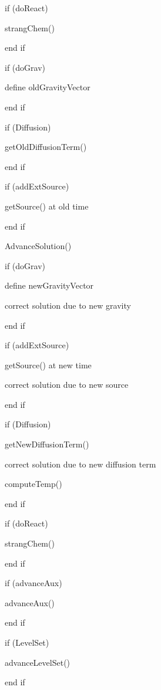 
\noindent

if (doReact)

\hspace{.1in}  strangChem()

end if

if (doGrav)

\hspace{.1in}  define oldGravityVector

end if

if (Diffusion)

\hspace{.1in}  getOldDiffusionTerm()

end if

if (addExtSource)

\hspace{.1in}  getSource() at old time

end if

AdvanceSolution()

if (doGrav)

\hspace{.1in}  define newGravityVector

\hspace{.1in}  correct solution due to new gravity

end if

if (addExtSource)

\hspace{.1in}  getSource() at new time

\hspace{.1in}  correct solution due to new source

end if

if (Diffusion)

\hspace{.1in}  getNewDiffusionTerm()

\hspace{.1in}  correct solution due to new diffusion term

\hspace{.1in}  computeTemp()

end if

if (doReact)

\hspace{.1in}  strangChem()

end if

if (advanceAux)

\hspace{.1in}  advanceAux()

end if

if (LevelSet)

\hspace{.1in}  advanceLevelSet()

end if

